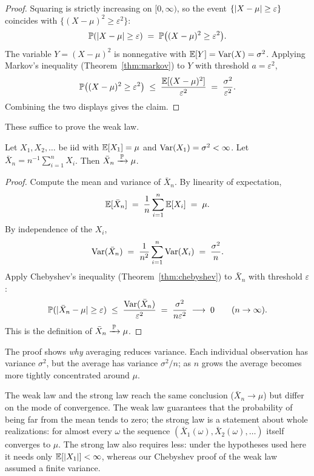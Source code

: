\begin{proof}
Squaring is strictly increasing on \([0, \infty)\), so the event \(\{\lvert X - \mu\rvert \ge \varepsilon\}\) coincides with \(\{(X - \mu)^2 \ge \varepsilon^2\}\):
\[
  \mathbb{P}(\lvert X - \mu\rvert \ge \varepsilon) \;=\; \mathbb{P}\bigl((X - \mu)^2 \ge \varepsilon^2\bigr).
\]
The variable \(Y = (X - \mu)^2\) is nonnegative with \(\mathbb{E}[Y] = \operatorname{Var}(X) = \sigma^2\). Applying Markov's inequality (Theorem~\ref{thm:markov}) to \(Y\) with threshold \(a = \varepsilon^2\),
\[
  \mathbb{P}\bigl((X - \mu)^2 \ge \varepsilon^2\bigr) \;\le\; \frac{\mathbb{E}[(X - \mu)^2]}{\varepsilon^2} \;=\; \frac{\sigma^2}{\varepsilon^2}.
\]
Combining the two displays gives the claim.
\end{proof}

These suffice to prove the weak law.

\begin{theorem}\label{thm:wlln}
Let \(X_1, X_2, \ldots\) be iid with \(\mathbb{E}[X_1] = \mu\) and \(\operatorname{Var}(X_1) = \sigma^2 < \infty\). Let \(\bar X_n = n^{-1} \sum_{i=1}^n X_i\). Then \(\bar X_n \xrightarrow{\,\mathbb{P}\,} \mu\).
\end{theorem}

\begin{proof}
Compute the mean and variance of \(\bar X_n\). By linearity of expectation,
\[
  \mathbb{E}[\bar X_n] \;=\; \frac{1}{n} \sum_{i=1}^n \mathbb{E}[X_i] \;=\; \mu.
\]
By independence of the \(X_i\),
\[
  \operatorname{Var}(\bar X_n) \;=\; \frac{1}{n^2} \sum_{i=1}^n \operatorname{Var}(X_i) \;=\; \frac{\sigma^2}{n}.
\]
Apply Chebyshev's inequality (Theorem~\ref{thm:chebyshev}) to \(\bar X_n\) with threshold \(\varepsilon\):
\[
  \mathbb{P}(\lvert\bar X_n - \mu\rvert \ge \varepsilon) \;\le\; \frac{\operatorname{Var}(\bar X_n)}{\varepsilon^2} \;=\; \frac{\sigma^2}{n \varepsilon^2} \;\longrightarrow\; 0 \qquad (n \to \infty).
\]
This is the definition of \(\bar X_n \xrightarrow{\,\mathbb{P}\,} \mu\).
\end{proof}

The proof shows \emph{why} averaging reduces variance. Each individual observation has variance \(\sigma^2\), but the average has variance \(\sigma^2 / n\); as \(n\) grows the average becomes more tightly concentrated around \(\mu\).

The weak law and the strong law reach the same conclusion (\(\bar X_n \to \mu\)) but differ on the mode of convergence. The weak law guarantees that the probability of being far from the mean tends to zero; the strong law is a statement about whole realizations: for almost every \(\omega\) the sequence \((\bar X_1(\omega), \bar X_2(\omega), \ldots)\) itself converges to \(\mu\). The strong law also requires less: under the hypotheses used here it needs only \(\mathbb{E}[\lvert X_1\rvert] < \infty\), whereas our Chebyshev proof of the weak law assumed a finite variance.

